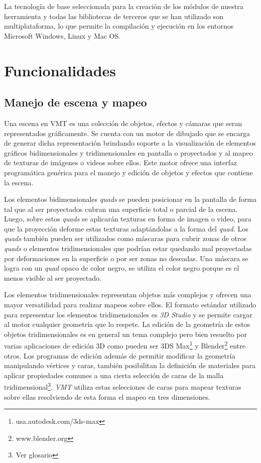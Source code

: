 La tecnología de base seleccionada para la creación de los módulos de nuestra herramienta y todas las bibliotecas de terceros que se han utilizado son multiplataforma, lo que permite la compilación y ejecución en los entornos Microsoft Windows, Linux y Mac OS.

\section{Funcionalidades}

\subsection{Manejo de escena y mapeo}

Una escena en VMT es una colección de objetos, efectos y cámaras que seran representados gráficamente. Se cuenta con un motor de dibujado que se encarga de generar dicha representación brindando soporte a la visualización de elementos gráficos bidimensionales y tridimensionales en pantalla o proyectados y al mapeo de texturas de imágenes o videos sobre ellos. Este motor ofrece una interfaz programática genérica para el manejo y edición de objetos y efectos que contiene la escena.

Los elementos bidimensionales \emph{quads} se pueden posicionar en la pantalla de forma tal que al ser proyectados cubran una superficie total o parcial de la escena. Luego, sobre estos \emph{quads} se aplicarán texturas en forma de imagen o video, para que la proyección deforme estas texturas adaptándolas a la forma del \emph{quad}.
Los \emph{quads} también pueden ser utilizados como máscaras para cubrir zonas de otros \emph{quads} o elementos tridimensionales que podrían estar quedando mal proyectadas por deformaciones en la superficie o por ser zonas no deseadas. Una máscara se logra con un \emph{quad} opaco de color negro, se utiliza el color negro porque es el menos visible al ser proyectado.

Los elementos tridimensionales representan objetos más complejos y ofrecen una mayor versatilidad para realizar mapeos sobre ellos.
El formato estándar utilizado para representar los elementos tridimensionales es \emph{3D Studio}\cite{3DS} y se permite cargar al motor cualquier geometría que lo respete.
La edición de la geometría de estos objetos tridimensionales es en general un tema complejo pero bien resuelto por varias aplicaciones de edición 3D como pueden ser 3DS Max\footnote{usa.autodesk.com/3ds-max} y Blender\footnote{www.blender.org} entre otros. %
Los programas de edición además de permitir modificar la geometría manipulando vértices y caras, también posibilitan la definición de materiales para aplicar propiedades comunes a una cierta selección de caras de la malla tridimensional\footnote{Ver glosario}. \emph{VMT} utiliza estas selecciones de caras para mapear texturas sobre ellas resolviendo de esta forma el mapeo en tres dimensiones.

